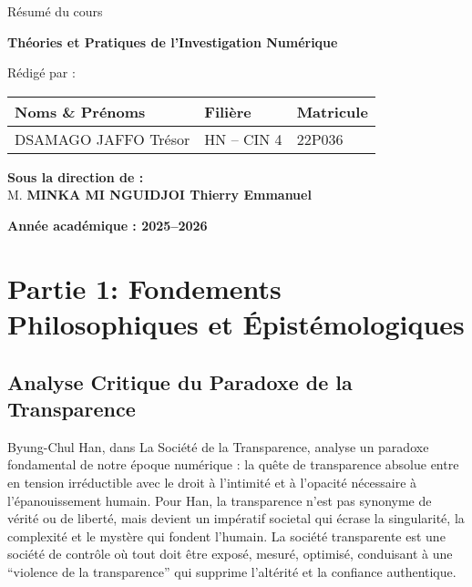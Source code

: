 \documentclass[12pt, a4paper]{article}
\begin{document}
\begin{titlepage}

	\vspace{1cm}

	{\Large Résumé du cours}

	\vspace{0.5cm}

	{\LARGE \textbf{Théories et Pratiques de l'Investigation Numérique}}

	\vspace{2cm}

	{\large Rédigé par :}

	\vspace{0.5cm}

	\begin{tabular}{|>{\centering\arraybackslash}m{8cm}
		|>{\centering\arraybackslash}m{4cm}
		|>{\centering\arraybackslash}m{3cm}|}
		\hline
		\textbf{Noms \& Prénoms} & \textbf{Filière} & \textbf{Matricule} \\
		\hline
		DSAMAGO JAFFO Trésor     & HN -- CIN 4      & 22P036             \\
		\hline
	\end{tabular}

	\vfill

	\begin{Large}
		\textbf{Sous la direction de :} \\
		M. \textbf{MINKA MI NGUIDJOI Thierry Emmanuel} \\
	\end{Large}

	\vspace{1cm}

	\textbf{Année académique : 2025--2026}
\end{titlepage}

\section*{Partie 1: Fondements Philosophiques et Épistémologiques}
\subsection{Analyse Critique du Paradoxe de la Transparence
}
Byung-Chul Han, dans La Société de la Transparence, analyse un paradoxe fondamental de notre époque numérique : la quête de transparence absolue entre en tension irréductible avec le droit à l’intimité et à l’opacité nécessaire à l’épanouissement humain. Pour Han, la transparence n’est pas synonyme de vérité ou de liberté, mais devient un impératif societal qui écrase la singularité, la complexité et le mystère qui fondent l’humain. La société transparente est une société de contrôle où tout doit être exposé, mesuré, optimisé, conduisant à une “violence de la transparence” qui supprime l’altérité et la confiance authentique.
\end{document}
